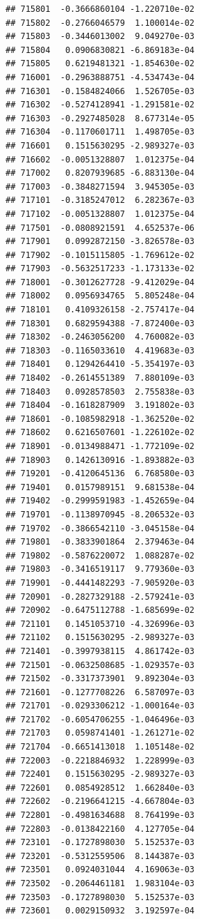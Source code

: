 \documentclass[ignorenonframetext,]{beamer}
\begin{document}
\begin{frame}[fragile]
\begin{verbatim}
## 715801  -0.3666860104 -1.220710e-02
## 715802  -0.2766046579  1.100014e-02
## 715803  -0.3446013002  9.049270e-03
## 715804   0.0906830821 -6.869183e-04
## 715805   0.6219481321 -1.854630e-02
## 716001  -0.2963888751 -4.534743e-04
## 716301  -0.1584824066  1.526705e-03
## 716302  -0.5274128941 -1.291581e-02
## 716303  -0.2927485028  8.677314e-05
## 716304  -0.1170601711  1.498705e-03
## 716601   0.1515630295 -2.989327e-03
## 716602  -0.0051328807  1.012375e-04
## 717002   0.8207939685 -6.883130e-04
## 717003  -0.3848271594  3.945305e-03
## 717101  -0.3185247012  6.282367e-03
## 717102  -0.0051328807  1.012375e-04
## 717501  -0.0808921591  4.652537e-06
## 717901   0.0992872150 -3.826578e-03
## 717902  -0.1015115805 -1.769612e-02
## 717903  -0.5632517233 -1.173133e-02
## 718001  -0.3012627728 -9.412029e-04
## 718002   0.0956934765  5.805248e-04
## 718101   0.4109326158 -2.757417e-04
## 718301   0.6829594388 -7.872400e-03
## 718302  -0.2463056200  4.760082e-03
## 718303  -0.1165033610  4.419683e-03
## 718401   0.1294264410 -5.354197e-03
## 718402  -0.2614551389  7.880109e-03
## 718403   0.0928578503  2.755838e-03
## 718404  -0.1618287909  3.191802e-03
## 718601  -0.1085982918 -1.362520e-02
## 718602   0.6216507601 -1.226102e-02
## 718901  -0.0134988471 -1.772109e-02
## 718903   0.1426130916 -1.893882e-03
## 719201  -0.4120645136  6.768580e-03
## 719401   0.0157989151  9.681538e-04
## 719402  -0.2999591983 -1.452659e-04
## 719701  -0.1138970945 -8.206532e-03
## 719702  -0.3866542110 -3.045158e-04
## 719801  -0.3833901864  2.379463e-04
## 719802  -0.5876220072  1.088287e-02
## 719803  -0.3416519117  9.779360e-03
## 719901  -0.4441482293 -7.905920e-03
## 720901  -0.2827329188 -2.579241e-03
## 720902  -0.6475112788 -1.685699e-02
## 721101   0.1451053710 -4.326996e-03
## 721102   0.1515630295 -2.989327e-03
## 721401  -0.3997938115  4.861742e-03
## 721501  -0.0632508685 -1.029357e-03
## 721502  -0.3317373901  9.892304e-03
## 721601  -0.1277708226  6.587097e-03
## 721701  -0.0293306212 -1.000164e-03
## 721702  -0.6054706255 -1.046496e-03
## 721703   0.0598741401 -1.261271e-02
## 721704  -0.6651413018  1.105148e-02
## 722003  -0.2218846932  1.228999e-03
## 722401   0.1515630295 -2.989327e-03
## 722601   0.0854928512  1.662840e-03
## 722602  -0.2196641215 -4.667804e-03
## 722801  -0.4981634688  8.764199e-03
## 722803  -0.0138422160  4.127705e-04
## 723101  -0.1727898030  5.152537e-03
## 723201  -0.5312559506  8.144387e-03
## 723501   0.0924031044  4.169063e-03
## 723502  -0.2064461181  1.983104e-03
## 723503  -0.1727898030  5.152537e-03
## 723601   0.0029150932  3.192597e-04

\end{verbatim}
\end{frame}
\end{document}
